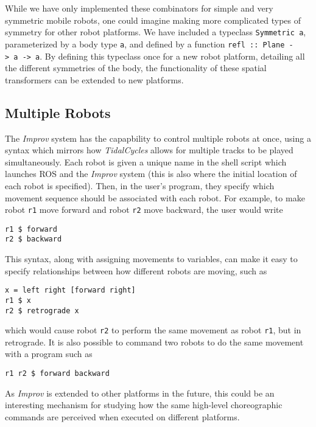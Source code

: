 \documentclass[sigchi-a]{acmart}
\begin{document}
While we have only implemented these combinators for simple and very
symmetric mobile robots, one could imagine making more complicated types
of symmetry for other robot platforms. We have included a typeclass
\texttt{Symmetric\ a}, parameterized by a body type \texttt{a}, and defined by a function
\texttt{refl\ ::\ Plane\ -\textgreater{}\ a\ -\textgreater{}\ a}. By defining this
typeclass once for a new robot platform, detailing all the different symmetries of
the body, the functionality of these spatial transformers can be
extended to new platforms.

\subsection{Multiple Robots}\label{multiple-robots}

The \emph{Improv} system has the capapbility to control multiple robots
at once, using a syntax which mirrors how \emph{TidalCycles} allows for
multiple tracks to be played simultaneously. Each robot is given a
unique name in the shell script which launches ROS and the \emph{Improv}
system (this is also where the initial location of each robot is
specified). Then, in the user's program, they specify which movement
sequence should be associated with each robot. For example, to make
robot \texttt{r1} move forward and robot \texttt{r2} move backward, the
user would write

\begin{verbatim}
r1 $ forward
r2 $ backward
\end{verbatim}

This syntax, along with assigning movements to variables, can make it easy to
specify relationships between how different robots are moving, such as

\begin{verbatim}
x = left right [forward right]
r1 $ x
r2 $ retrograde x
\end{verbatim}


which would cause robot \texttt{r2} to perform the same movement as
robot \texttt{r1}, but in retrograde. It is also possible to command two robots
to do the same movement with a program such as

\begin{verbatim}
r1 r2 $ forward backward
\end{verbatim}

As \emph{Improv} is extended to other platforms in the future, this could be an
interesting mechanism for studying how the same high-level choreographic
commands are perceived when executed on different platforms.
\end{document}
